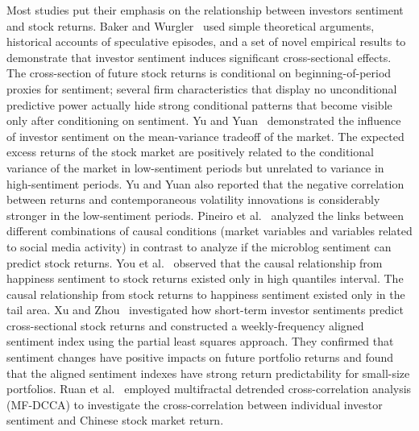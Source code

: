 \documentclass[review,3p,times,12pt,number]{elsarticle}
\begin{document}
Most studies put their emphasis on the relationship between investors sentiment and stock returns.
Baker and Wurgler~\cite{baker2006} used simple theoretical arguments, historical accounts of speculative episodes, and a set of novel empirical results to demonstrate that investor sentiment induces significant cross-sectional effects. The cross-section of future stock returns is conditional on beginning-of-period proxies for sentiment; several firm characteristics that display no unconditional predictive power actually hide strong conditional patterns that become visible only after conditioning on sentiment.
Yu and Yuan~\cite{Yu2011} demonstrated the influence of investor sentiment on the mean-variance tradeoff of the market. The expected excess returns of the stock market are positively related to the conditional variance of the market in low-sentiment periods but unrelated to variance in high-sentiment periods. Yu and Yuan also reported that the negative correlation between returns and contemporaneous volatility innovations is considerably stronger in the low-sentiment periods.
Pineiro et al.~\cite{Pi2016Examining} analyzed the links between different combinations of causal conditions (market variables and variables related to social media activity) in contrast to analyze if the microblog sentiment can predict stock returns.
You et al.~\cite{You2017Twitter} observed that the causal relationship from happiness sentiment to stock returns existed only in high quantiles interval. The causal relationship from stock returns to happiness sentiment existed only in the tail area.
Xu and Zhou~\cite{Xu2018A} investigated how short-term investor sentiments predict cross-sectional stock returns and constructed a weekly-frequency aligned sentiment index using the partial least squares approach. They confirmed that sentiment changes have positive impacts on future portfolio returns and found that the aligned sentiment indexes have strong return predictability  for small-size portfolios.
Ruan et al.~\cite{Ruan2018Cross} employed multifractal detrended cross-correlation analysis (MF-DCCA) to investigate the cross-correlation between individual investor sentiment and Chinese stock market return.

\end{document}
